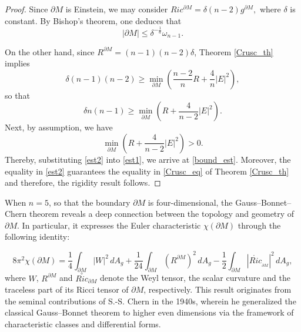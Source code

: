 \documentclass{amsart}
\numberwithin{equation}{section}
\begin{document}
	
\begin{proof}
Since $\partial M$ is Einstein, we may consider $Ric^{\partial M}=\delta(n-2)g^{\partial M},$ where $\delta$ is constant. By Bishop's theorem, one deduces that
\begin{equation}\label{est1}
|\partial M|\leq\delta^{-\frac{1}{a}}\omega_{n-1}.
\end{equation}



On the other hand, since $R^{\partial M}=(n-1)(n-2)\delta$, Theorem \ref{Crusc_th} implies
		\begin{equation*}
			\delta(n-1)(n-2)\geq\displaystyle\min_{\partial M}\left(\frac{n-2}{n}R+\frac{4}{n}|E|^{2}\right),
		\end{equation*}
		so that
		\begin{equation}\label{est2}
			\delta n(n-1)\geq \min_{\partial M}\left(R+\frac{4}{n-2}|E|^{2}\right).
		\end{equation}
		Next, by assumption, we have 
		\[
		\min_{\partial M} \left( R + \frac{4}{n-2} |E|^{2} \right) > 0.
		\]  
		Thereby, substituting \eqref{est2} into \eqref{est1}, we arrive at \eqref{bound_est}. Moreover, the equality in \eqref{est2} guarantees the equality in \eqref{Crusc_eq} of Theorem \ref{Crusc_th} and therefore, the rigidity result follows.
	\end{proof}




When \( n = 5 \), so that the boundary \( \partial M \) is four-dimensional, the Gauss--Bonnet--Chern theorem reveals a deep connection between the topology and geometry of \( \partial M \). In particular, it expresses the Euler characteristic \( \chi(\partial M) \) through the following identity:

\begin{equation}\label{CGB}
8\pi^{2} \chi(\partial M) = \frac{1}{4} \int_{\partial M} |W|^{2} \, dA_g + \frac{1}{24} \int_{\partial M} \left(R^{\partial M}\right)^{2} \, dA_g - \frac{1}{2} \int_{\partial M} |\mathring{Ric}_{_{\partial M}} |^{2} \, dA_g,
\end{equation}
where \( W \), \(R^{\partial M} \) and \( \overset{\circ}{Ric}_{\partial M} \) denote the Weyl tensor, the scalar curvature and the traceless part of its Ricci tensor of \( \partial M \), respectively. This result originates from the seminal contributions of S.-S. Chern \cite{chern1944} in the 1940s, wherein he generalized the classical Gauss–Bonnet theorem to higher even dimensions via the framework of characteristic classes and differential forms.
\end{document}
